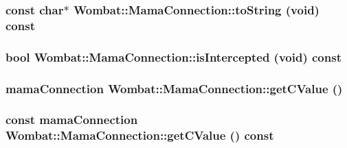 \label{classWombat_1_1MamaConnection_a545f8a3b6228e04251f4de66ebd69cd8}
\hypertarget{classWombat_1_1MamaConnection_a03540a8a1e8b423803870ebeea514b8d}{
\subsubsection[{toString}]{\setlength{\rightskip}{0pt plus 5cm}const char$\ast$ Wombat::MamaConnection::toString (void) const}}
\label{classWombat_1_1MamaConnection_a03540a8a1e8b423803870ebeea514b8d}
\hypertarget{classWombat_1_1MamaConnection_ac07ea9c4b10b04543db34fc35f1e2c6d}{
\subsubsection[{isIntercepted}]{\setlength{\rightskip}{0pt plus 5cm}bool Wombat::MamaConnection::isIntercepted (void) const}}
\label{classWombat_1_1MamaConnection_ac07ea9c4b10b04543db34fc35f1e2c6d}
\hypertarget{classWombat_1_1MamaConnection_ae62786d245024af569ad40fef909df46}{
\subsubsection[{getCValue}]{\setlength{\rightskip}{0pt plus 5cm}mamaConnection Wombat::MamaConnection::getCValue ()}}
\label{classWombat_1_1MamaConnection_ae62786d245024af569ad40fef909df46}
\hypertarget{classWombat_1_1MamaConnection_a3f89d84dbe3c026a74da54c3630729c4}{
\subsubsection[{getCValue}]{\setlength{\rightskip}{0pt plus 5cm}const mamaConnection Wombat::MamaConnection::getCValue () const}}
\label{classWombat_1_1MamaConnection_a3f89d84dbe3c026a74da54c3630729c4}
